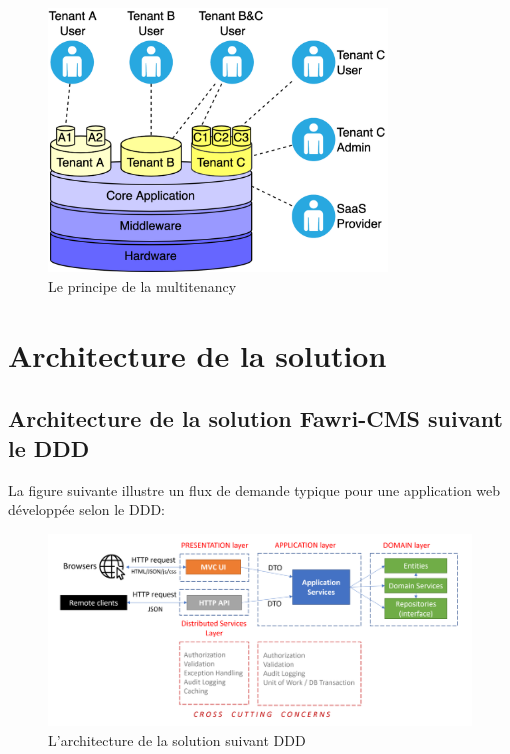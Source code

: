 \begin{figure}[H]
    \centering
    \includegraphics[width=9cm]{Figures/multytenancy.png}
    \caption{Le principe de la multitenancy}
\end{figure}

\section{Architecture de la solution}

\subsection{Architecture de la solution Fawri-CMS suivant le DDD}

\hspace{\parindent}La figure suivante illustre un flux de demande typique pour une application web développée selon le DDD:


\begin{figure}[H]
    \centering
    \includegraphics[width=17cm]{Figures/DDD flow.png}
    \caption{L'architecture de la solution suivant DDD }
\end{figure}


